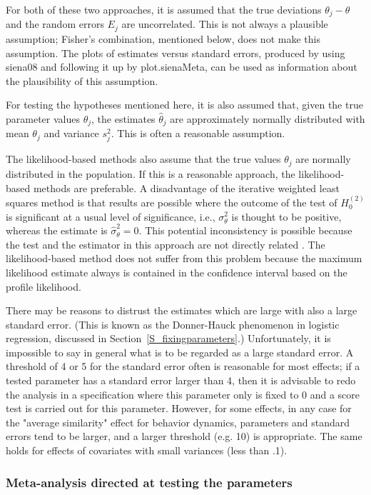 \documentclass[a4paper,fleqn,11pt]{article}
\newcommand{\+}{\, + \,}
\begin{document}
For both of these two approaches,
it is assumed that the true deviations $\theta_j - \theta$
and the random errors $E_j$ are uncorrelated.
This is not always a plausible assumption; Fisher's combination,
mentioned below, does not make this assumption.
The plots of estimates versus standard errors, produced
by using \textsf{siena08} and following it up by
\textsf{plot.sienaMeta}, can be used as information about the
plausibility of this assumption.

For testing the hypotheses mentioned here, it is also assumed that,
given the true parameter values $\theta_j$, the
estimates $\hat{\theta}_j$ are approximately normally distributed
with mean $\theta_j$ and variance $s^2_j$.
This is often a reasonable assumption.

The likelihood-based methods also assume that the true values
$\theta_j$ are normally distributed in the population.
If this is a reasonable approach, the likelihood-based methods
are preferable.
A disadvantage of the iterative weighted least squares method
is that results are possible
where the outcome of the test of $H_0^{(2)}$ is significant
at a usual level of significance,
i.e., $\sigma^2_\theta$ is thought to be positive, whereas
the estimate is $\hat\sigma^2_\theta = 0$.
This  potential inconsistency is possible because the test
and the estimator in this approach are not directly related
\citep[cf.][]{SnijdersBaerveldt03}.
The likelihood-based method does not suffer from this problem
because the maximum likelihood estimate always is contained
in the confidence interval based on the profile likelihood.
\bigskip

There may be reasons to distrust the estimates which are
large with also a large standard error. (This is known as the Donner-Hauck
phenomenon in logistic regression, discussed in
Section~\ref{S_fixingparameters}.)
Unfortunately, it is impossible to say in
general what is to be regarded as a large standard error.
A threshold of 4 or 5 for the standard error often is reasonable
for most effects; if a tested
parameter has a standard error larger than 4, then it is advisable to redo
the analysis in a specification where this parameter only is fixed to 0 and a
score test is carried out for this parameter. However, for some effects, in
any case for the "average similarity" effect for behavior dynamics,
parameters and standard errors tend to be larger, and a larger threshold
(e.g. 10) is appropriate. The same holds for effects of covariates with small
variances (less than .1).

\subsubsection{Meta-analysis directed at testing the parameters}
\end{document}
